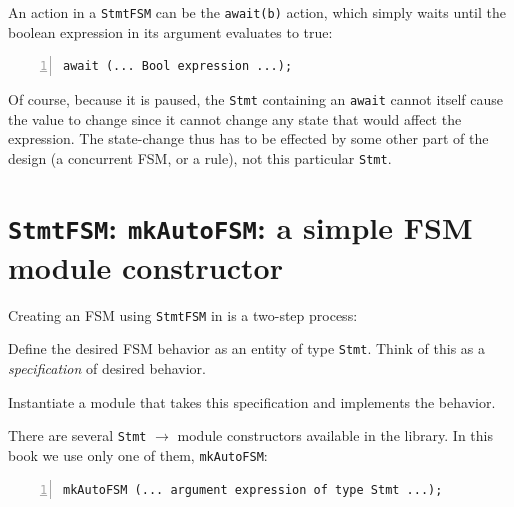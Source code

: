 
An action in a \verb|StmtFSM| can be the \verb|await(b)| action, which
simply waits until the boolean expression in its argument evaluates to
true:

{\footnotesize
\begin{Verbatim}[frame=single, numbers=left]
   await (... Bool expression ...);
\end{Verbatim}
}

Of course, because it is paused, the \verb|Stmt| containing an
\verb|await| cannot itself cause the value to change since it cannot
change any state that would affect the expression.  The state-change
thus has to be effected by some other part of the {\BSV} design (a
concurrent FSM, or a rule), not this particular \verb|Stmt|.


\section{{\tt StmtFSM}: {\tt mkAutoFSM}: a simple FSM module constructor}

\label{Sec_AutoFSM}


Creating an FSM using \verb|StmtFSM| in {\BSV} is a two-step process:

\begin{tightlist}

 \item Define the desired FSM behavior as an entity of type
       \verb|Stmt|.  Think of this as a \emph{specification} of
       desired behavior.

 \item Instantiate a module that takes this specification and
       implements the behavior.

\end{tightlist}

There are several \verb|Stmt| $\longrightarrow$ module constructors
available in the {\BSV} library.  In this book we use only one of them,
\verb|mkAutoFSM|:

{\footnotesize
\begin{Verbatim}[frame=single, numbers=left]
   mkAutoFSM (... argument expression of type Stmt ...);
\end{Verbatim}
}

